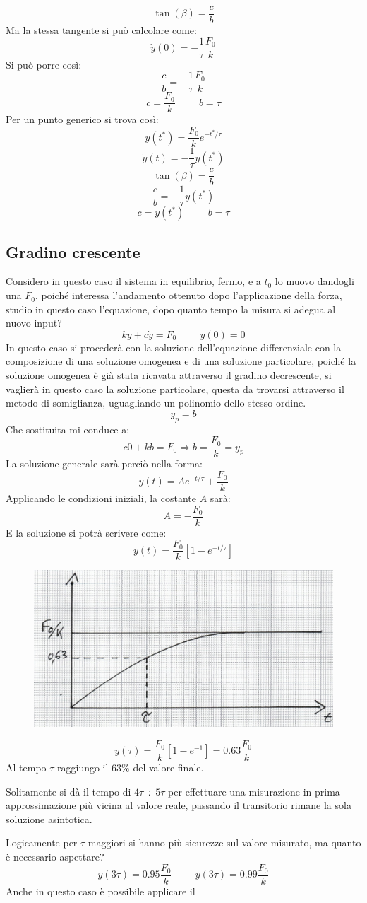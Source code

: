 \documentclass[a4paper, 15pt]{article}
\begin{document}
\begin{adjustwidth}{2in}{}
	\[ \tan(\beta) = \dfrac{c}{b}\]
	Ma la stessa tangente si può calcolare come: 
	\[\dot{y}(0) = -\dfrac{1}{\tau} \dfrac{F_0}{k}\]
	Si può porre così:
	\[ \dfrac{c}{b} = -\dfrac{1}{\tau} \dfrac{F_0}{k} \]
	\[ c = \dfrac{F_0}{k} \hspace{1cm} b = \tau \]
\newpage	
	Per un punto generico si trova così:
	\[  y(t^*) = \dfrac{F_0}{k}e^{-t^*/\tau}\] 
	\[\dot{y}(t) = -\dfrac{1}{\tau} y(t^*)\]
	\[ \tan(\beta) = \dfrac{c}{b}\]
	\[\dfrac{c}{b} = -\dfrac{1}{\tau} y(t^*)  \]
	\[ c = y(t^*) \hspace{1cm} b = \tau \]	
\end{adjustwidth}
\subsection{Gradino crescente} 	
\begin{adjustwidth}{2in}{}	
	Considero in questo caso il sistema in equilibrio, fermo, e a $t_0$ lo muovo dandogli una $F_0$, poiché interessa l'andamento ottenuto dopo l'applicazione della forza, studio in questo caso l'equazione, dopo quanto tempo la misura si adegua al nuovo input? 
	\[ ky + c\dot{y} = F_0 \hspace{1cm} y(0) = 0\]
	In questo caso si procederà con la soluzione dell'equazione differenziale con la composizione di una soluzione omogenea e di una soluzione particolare, poiché la soluzione omogenea è già stata ricavata attraverso il gradino decrescente, si vaglierà in questo caso la soluzione particolare, questa da trovarsi attraverso il metodo di somiglianza, uguagliando un polinomio dello stesso ordine. 
	\[ y_p = b \]
	Che sostituita mi conduce a: 
	\[ c0 + kb = F_0 \Rightarrow b = \dfrac{F_0}{k} = y_p \]
	La soluzione generale sarà perciò nella forma: 
	\[ y(t) = Ae^{-t/\tau} + \dfrac{F_0}{k}\]
	Applicando le condizioni iniziali, la costante $A$ sarà:
	\[ A = - \dfrac{F_0}{k}\] E la soluzione si potrà scrivere come:
	\[ y(t) = \dfrac{F_0}{k}\left[1- e^{-t/\tau}\right] \] 
\begin{figure}[H]
	\centering
	\includegraphics[width=0.4\linewidth]{fig/mm5}
	\label{fig:mm5}
\end{figure}	
	\[ y(\tau) = \dfrac{F_0}{k}\left[1- e^{-1}\right] = 0.63\dfrac{F_0}{k}  \]
	Al tempo $\tau$ raggiungo il $63\%$ del valore finale. 
	
	Solitamente si dà il tempo di $4\tau\div 5\tau$ per effettuare una misurazione in prima approssimazione più vicina al valore reale, passando il transitorio rimane la sola soluzione asintotica. 
	
	Logicamente per $\tau$ maggiori si hanno più sicurezze sul valore misurato, ma quanto è necessario aspettare? 	
	\[ y(3\tau) = 0.95\dfrac{F_0}{k} \hspace{1cm} y(3\tau) = 0.99\dfrac{F_0}{k}  \]	
	Anche in questo caso è possibile applicare il 
	\end{adjustwidth}
\end{document}
